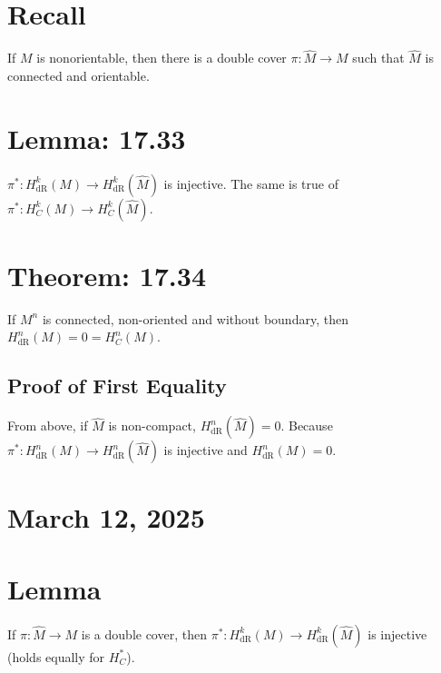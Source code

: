 \documentclass[11pt]{article}
\begin{document}
\section*{Recall}
\label{sec:org682397c}
If \(M\) is nonorientable, then there is a double cover \(\pi:\hat{M}\to M\) such that \(\hat{M}\) is connected and orientable.\\
\section*{Lemma: 17.33}
\label{sec:org5f90bb6}
\(\pi^{*}:H^{k}_{\text{dR}}(M)\to H^{k}_{\text{dR}}(\hat{M})\) is injective. The same is true of \(\pi^{*}:H^{k}_{C}(M)\to H^{k}_{C}(\hat{M})\).\\
\section*{Theorem: 17.34}
\label{sec:org8d12ef1}
If \(M^{n}\) is connected, non-oriented and without boundary, then \(H_{\text{dR}}^{n}(M)=0=H_{C}^{n}(M)\).\\
\subsection*{Proof of First Equality}
\label{sec:org1186c68}
From above, if \(\hat{M}\) is non-compact, \(H^{n}_{\text{dR}}(\hat{M})=0\). Because \(\pi^{*}:H^{n}_{\text{dR}}(M)\to H^{n}_{\text{dR}}(\hat{M})\) is injective and \(H^{n}_{\text{dR}}(M)=0\).\\
\section*{March 12, 2025}
\label{sec:org80dc207}
\section*{Lemma}
\label{sec:org1119e24}
If \(\pi:\hat{M}\to M\) is a double cover, then \(\pi^{*}:H^{k}_{\text{dR}}(M)\to H^{k}_{\text{dR}}(\hat{M})\) is injective (holds equally for \(H^{*}_{C}\)).\\
\end{document}
